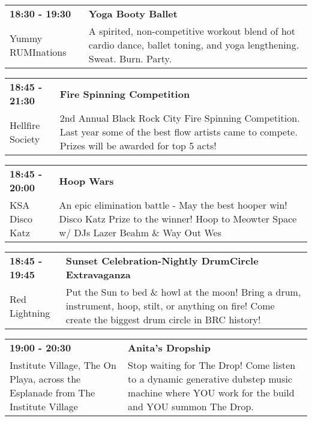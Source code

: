 \begin{tabular}{ p{1in} p{2.2in} }
    \textbf{18:30 - 19:30} & \textbf{Yoga Booty Ballet} \\
    Yummy RUMInations \newline  & A spirited, non-competitive workout blend of hot cardio dance, ballet toning, and yoga lengthening. Sweat.  Burn.  Party. \\
    \hline 
\end{tabular}
    
\begin{tabular}{ p{1in} p{2.2in} }
    \textbf{18:45 - 21:30} & \textbf{Fire Spinning Competition} \\
    Hellfire Society \newline  & 2nd Annual Black Rock City Fire Spinning Competition. Last year some of the best flow artists came to compete. Prizes will be awarded for top 5 acts! \\
    \hline 
\end{tabular}
    
\begin{tabular}{ p{1in} p{2.2in} }
    \textbf{18:45 - 20:00} & \textbf{Hoop Wars} \\
    KSA Disco Katz \newline  & An epic elimination battle - May the best hooper win! Disco Katz Prize to the winner! Hoop to Meowter Space w/ DJs Lazer Beahm \& Way Out Wes \\
    \hline 
\end{tabular}
    
\begin{tabular}{ p{1in} p{2.2in} }
    \textbf{18:45 - 19:45} & \textbf{Sunset Celebration-Nightly DrumCircle Extravaganza} \\
    Red Lightning \newline  & Put the Sun to bed \& howl at the moon! Bring a drum, instrument, hoop, stilt, or anything on fire! Come create the biggest drum circle in BRC history! \\
    \hline 
\end{tabular}
    
\begin{tabular}{ p{1in} p{2.2in} }
    \textbf{19:00 - 20:30} & \textbf{Anita's Dropship} \\
    Institute Village, The \newline On Playa, across the Esplanade from The Institute Village & Stop waiting for The Drop!
Come listen to a dynamic generative dubstep music machine where YOU work for the build and YOU summon The Drop. \\
    \hline 
\end{tabular}
    
